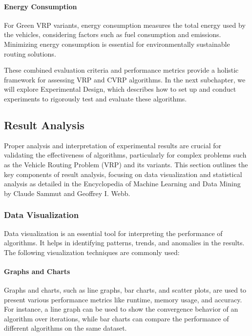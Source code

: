 \documentclass[
]{article}
\begin{document}
  \paragraph{Energy Consumption} For Green VRP variants, energy consumption measures the total energy used by the vehicles, considering factors such as fuel consumption and emissions. Minimizing energy consumption is essential for environmentally sustainable routing solutions.
  
  
  These combined evaluation criteria and performance metrics provide a holistic framework for assessing VRP and CVRP algorithms. In the next subchapter, we will explore Experimental Design, which describes how to set up and conduct experiments to rigorously test and evaluate these algorithms.


  \subsection{Result Analysis}

Proper analysis and interpretation of experimental results are crucial for validating the effectiveness of algorithms, particularly for complex problems such as the Vehicle Routing Problem (VRP) and its variants. This section outlines the key components of result analysis, focusing on data visualization and statistical analysis as detailed in the Encyclopedia of Machine Learning and Data Mining by Claude Sammut and Geoffrey I. Webb.

\subsubsection{Data Visualization}

Data visualization is an essential tool for interpreting the performance of algorithms. It helps in identifying patterns, trends, and anomalies in the results. The following visualization techniques are commonly used:

\paragraph{Graphs and Charts}

Graphs and charts, such as line graphs, bar charts, and scatter plots, are used to present various performance metrics like runtime, memory usage, and accuracy. For instance, a line graph can be used to show the convergence behavior of an algorithm over iterations, while bar charts can compare the performance of different algorithms on the same dataset.
\end{document}
